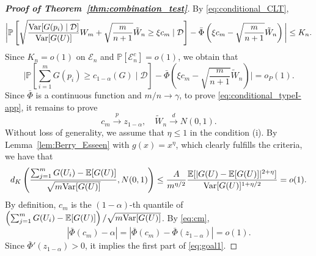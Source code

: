 \documentclass[11pt]{article}
\newcommand{\Var}{\textnormal{Var}}
\def\E{\mathbb{E}}
\renewcommand{\P}{\mathbb{P}}
\begin{document}
\begin{proof}[\textbf{Proof of Theorem~\ref{thm:combination_test}}]
By \eqref{eq:conditional_CLT},
\[\bigg|\P\left[\sqrt{\frac{\Var[G(p_i)\mid \mathcal{D}]}{\Var[G(U)]}}W_{m} + \sqrt{\frac{m}{n + 1}}\tilde{W}_{n}\ge \xi c_{m}\mid \mathcal{D}\right] - \bar{\Phi}\left(\xi c_{m} - \sqrt{\frac{m}{n + 1}}\tilde{W}_{n}\right)\bigg| \le K_{n}.\]
Since $K_{n} = o(1)$ on $\mathcal{E}_{n}$ and $\P[\mathcal{E}_{n}^{c}] = o(1)$, we obtain that 
\begin{equation}\label{eq:step1}
\bigg|\P\left[\sum_{i=1}^{m}G(p_i)\ge c_{1 - \alpha}(G)\mid \mathcal{D}\right] -  \bar{\Phi}\left(\xi c_{m} - \sqrt{\frac{m}{n + 1}}\tilde{W}_{n}\right)\bigg| = o_{P}(1).
\end{equation}
Since $\bar{\Phi}$ is a continuous function and $m / n\rightarrow \gamma$, to prove \eqref{eq:conditional_typeI-app}, it remains to prove
\begin{equation}\label{eq:goal1}
c_{m}\stackrel{p}{\rightarrow} z_{1 - \alpha}, \quad \tilde{W}_{n}\stackrel{d}{\rightarrow} N(0, 1).
\end{equation}
Without loss of generality, we assume that $\eta \le 1$ in the condition (i). By Lemma~\ref{lem:Berry_Esseen} with $g(x) = x^{\eta}$, which clearly fulfills the criteria, we have that
\begin{equation}\label{eq:cm}
d_{K}\left(\frac{\sum_{j=1}^{m}G(U_i) - \E[G(U)] }{\sqrt{m\Var[G(U)]}}, N(0, 1)\right)\le \frac{A}{m^{\eta / 2}}\frac{\E[|G(U) - \E[G(U)]|^{2 + \eta}]}{\Var[G(U)]^{1 + \eta/2}} = o(1).
\end{equation}
By definition, $c_{m}$ is the $(1 - \alpha)$-th quantile of $\left(\sum_{j=1}^{m}G(U_i) - \E[G(U)]\right) / \sqrt{m\Var[G(U)]}$. By \eqref{eq:cm},
\[|\bar{\Phi}(c_{m}) - \alpha| = |\bar{\Phi}(c_{m}) - \bar{\Phi}(z_{1 - \alpha})| = o(1).\]
Since $\bar{\Phi}'(z_{1 - \alpha}) > 0$, it implies the first part of \eqref{eq:goal1}. 


\end{proof}
\end{document}

